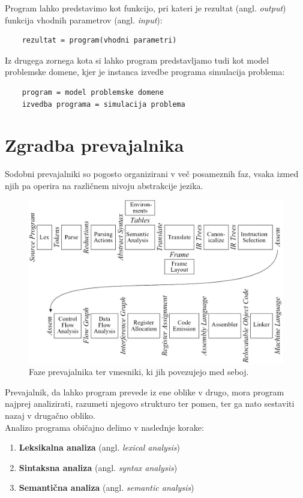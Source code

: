 \documentclass[a4paper, 12pt]{book}
\begin{document}
Program lahko predstavimo kot funkcijo, pri kateri je rezultat (angl. \textit{output}) funkcija vhodnih parametrov (angl. \textit{input}):
\begin{lstlisting}
	rezultat = program(vhodni parametri)
\end{lstlisting}

Iz drugega zornega kota si lahko program predstavljamo tudi kot model problemske domene, kjer je instanca izvedbe programa simulacija problema:
\begin{lstlisting}
	program = model problemske domene
	izvedba programa = simulacija problema
\end{lstlisting}
\cite{computationalModel}

\section{Zgradba prevajalnika}

Sodobni prevajalniki so pogosto organizirani v več posameznih faz, vsaka izmed njih pa operira na različnem nivoju abstrakcije jezika. \cite{modernCompiler}

\begin{figure}[h]
	\begin{center}
		\includegraphics[width=1\textwidth]{resources/compilerPhases.jpg}
	\end{center}
	\caption{Faze prevajalnika ter vmesniki, ki jih povezujejo med seboj.}
	\label{pic1}
\end{figure}

Prevajalnik, da lahko program prevede iz ene oblike v drugo, mora program najprej analizirati, razumeti njegovo strukturo ter pomen, ter ga nato sestaviti nazaj v drugačno obliko.  \\
Analizo programa običajno delimo v naslednje korake:
\begin{enumerate}
	\item \textbf{Leksikalna analiza} (angl. \textit{lexical analysis})
	\item \textbf{Sintaksna analiza} (angl. \textit{syntax analysis})
	\item \textbf{Semantična analiza} (angl. \textit{semantic analysis})
\end{enumerate}
\cite{modernCompiler}
\end{document}
